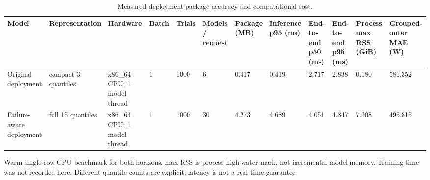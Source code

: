 \begin{table}[t]
\centering
\caption{Measured deployment-package accuracy and computational cost.}
\label{tab:a5_computational_cost}
\small
\begin{tabular}{llllllllllll}
\toprule
Model & Representation & Hardware & Batch & Trials & Models / request & Package (MB) & Inference p95 (ms) & End-to-end p50 (ms) & End-to-end p95 (ms) & Process max RSS (GiB) & Grouped-outer MAE (W) \\
\midrule
Original deployment & compact 3 quantiles & x86\_64 CPU; 1 model thread & 1 & 1000 & 6 & 0.417 & 0.419 & 2.717 & 2.838 & 0.180 & 581.352 \\
Failure-aware deployment & full 15 quantiles & x86\_64 CPU; 1 model thread & 1 & 1000 & 30 & 4.273 & 4.689 & 4.051 & 4.847 & 7.308 & 495.815 \\
\bottomrule
\end{tabular}
\vspace{2pt}\par\footnotesize Warm single-row CPU benchmark for both horizons. max RSS is process high-water mark, not incremental model memory. Training time was not recorded here. Different quantile counts are explicit; latency is not a real-time guarantee.
\end{table}
